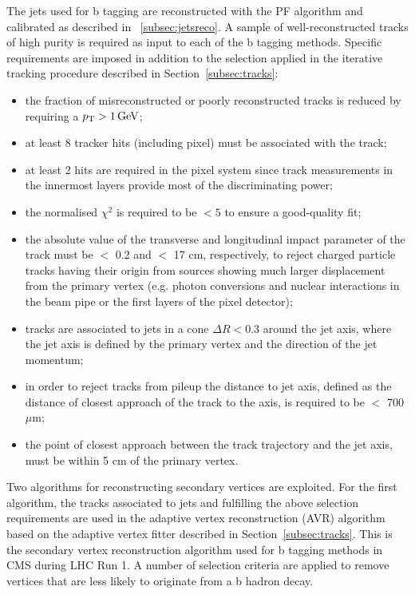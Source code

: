 The jets used for b tagging are reconstructed with the PF algorithm and calibrated as described in ~\ref{subsec:jetsreco}. A sample of well-reconstructed tracks of high purity is required as input to each of the b tagging methods. Specific requirements are imposed in addition to the selection applied in the iterative tracking procedure described in Section~\ref{subsec:tracks}:

\begin{itemize}
\item the fraction of misreconstructed or poorly reconstructed tracks is reduced by requiring a $p_{\mathrm{T}} >1\,\text{Ge\hspace{-.08em}V}$;
\item at least 8 tracker hits (including pixel) must be associated with the track;
\item at least 2 hits are required in the pixel system since track measurements in the innermost layers provide most of the discriminating power;
\item the normalised $\chi^2$ is required to be $< 5$ to ensure a good-quality fit;
\item the absolute value of the transverse and longitudinal impact parameter of the track must be $<$ 0.2 and $<$ 17 cm, respectively, to reject charged particle tracks having their origin from sources showing much larger displacement from the primary vertex (e.g. photon conversions and nuclear interactions in the beam pipe or the first layers of the pixel detector);
\item tracks are associated to jets in a cone $\Delta R < 0.3$ around the jet axis, where the jet axis is defined by the primary vertex and the direction of the jet momentum;
\item in order to reject tracks from pileup the distance to jet axis, defined as the distance of closest approach of the track to the axis, is required to be $<$ 700$\mu$m;
\item the point of closest approach between the track trajectory and the jet axis, must be within 5 cm of the primary vertex.
\end{itemize}

Two algorithms for reconstructing secondary vertices are exploited. For the first algorithm, the tracks associated to jets and fulfilling the above selection requirements are used in the adaptive vertex reconstruction (AVR) algorithm~\cite{Waltenberger:1166320} based on the adaptive vertex fitter described in Section~\ref{subsec:tracks}. This is the secondary vertex reconstruction algorithm used for b tagging methods in CMS during LHC Run 1. A number of selection criteria are applied to remove vertices that are less likely to originate from a b hadron decay. 

